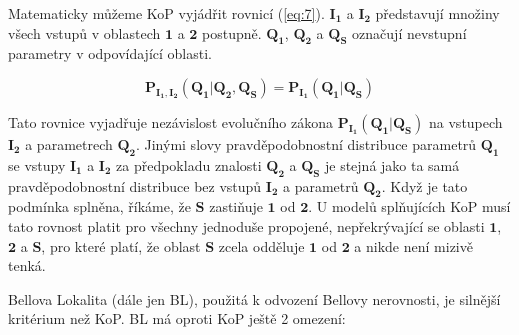 Matematicky můžeme KoP vyjádřit rovnicí (\ref{eq:7}). $\bm{I_{1}}$ a $\bm{I_{2}}$ představují množiny všech vstupů v oblastech $\bm{1}$ a $\bm{2}$ postupně. $\bm{Q_{1}}$, $\bm{Q_{2}}$ a $\bm{Q_{S}}$ označují nevstupní parametry v odpovídající oblasti.

\begin{equation}
    \bm{P_{I_{1},I_{2}}(Q_{1}|Q_{2}, Q_{S}) = P_{I_{1}}(Q_{1}|Q_{S})}
    \label{eq:7}
\end{equation}

Tato rovnice vyjadřuje nezávislost evolučního zákona $\bm{P_{I_{1}}(Q_{1}|Q_{S})}$ na vstupech $\bm{I_{2}}$ a parametrech $\bm{Q_{2}}$. Jinými slovy pravděpodobnostní distribuce parametrů $\bm{Q_{1}}$ se vstupy $\bm{I_{1}}$ a $\bm{I_{2}}$ za předpokladu znalosti $\bm{Q_{2}}$ a $\bm{Q_{S}}$ je stejná jako ta samá pravděpodobnostní distribuce bez vstupů $\bm{I_{2}}$ a parametrů $\bm{Q_{2}}$. Když je tato podmínka splněna, říkáme, že $\bm{S}$ zastiňuje $\bm{1}$ od $\bm{2}$. U modelů splňujících KoP musí tato rovnost platit pro všechny jednoduše propojené, nepřekrývající se oblasti $\bm{1}$, $\bm{2}$ a $\bm{S}$, pro které platí, že oblast $\bm{S}$ zcela odděluje $\bm{1}$ od $\bm{2}$ a nikde není mizivě tenká.

Bellova Lokalita (dále jen BL), použitá k odvození Bellovy nerovnosti, je silnější kritérium než KoP. BL má oproti KoP ještě 2 omezení:

